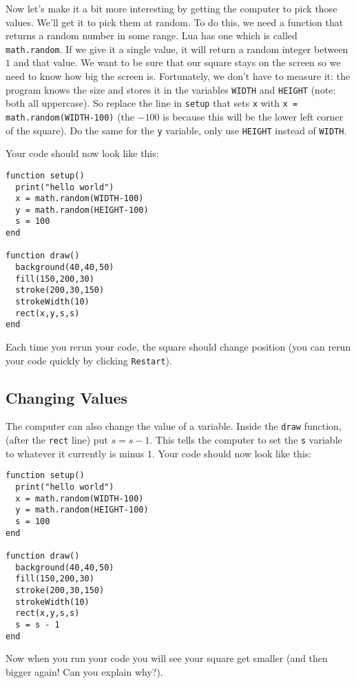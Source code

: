 \documentclass[
  xhtml,%
  use filename%
]{internet}
\begin{document}
Now let's make it a bit more interesting by getting the computer to pick those values.
We'll get it to pick them at random.
To do this, we need a function that returns a random number in some range.
Lua has one which is called \verb+math.random+.
If we give it a single value, it will return a random integer between \(1\) and that value.
We want to be sure that our square stays on the screen so we need to know how big the screen is.
Fortunately, we don't have to measure it: the program knows the size and stores it in the variables \verb+WIDTH+ and \verb+HEIGHT+ (note: both all uppercase).
So replace the line in \verb+setup+ that sets \verb+x+ with \verb+x = math.random(WIDTH-100)+ (the \(-100\) is because this will be the lower left corner of the square).
Do the same for the \verb+y+ variable, only use \verb+HEIGHT+ instead of \verb+WIDTH+.

Your code should now look like this:

\begin{verbatim}
function setup()
  print("hello world")
  x = math.random(WIDTH-100)
  y = math.random(HEIGHT-100)
  s = 100
end

function draw()
  background(40,40,50)
  fill(150,200,30)
  stroke(200,30,150)
  strokeWidth(10)
  rect(x,y,s,s)
end
\end{verbatim}

Each time you rerun your code, the square should change position (you can rerun your code quickly by clicking \verb+Restart+).

\subsection{Changing Values}

The computer can also change the value of a variable.
Inside the \verb+draw+ function, (after the \verb+rect+ line) put \(s = s - 1\).
This tells the computer to set the \verb+s+ variable to whatever it currently is minus \(1\).
Your code should now look like this:

\begin{verbatim}
function setup()
  print("hello world")
  x = math.random(WIDTH-100)
  y = math.random(HEIGHT-100)
  s = 100
end

function draw()
  background(40,40,50)
  fill(150,200,30)
  stroke(200,30,150)
  strokeWidth(10)
  rect(x,y,s,s)
  s = s - 1
end
\end{verbatim}

Now when you run your code you will see your square get smaller (and then bigger again!  Can you explain why?).
\end{document}
